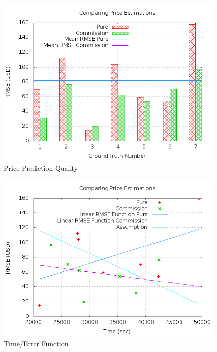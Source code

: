 \begin{figure}
\centering
\includegraphics[scale=0.55]{images/plots/crowdsourcing/plot_price_rmse.png}
\caption{Price Prediction Quality}
\label{crowdsourcing_desc_length}
\end{figure}
\begin{figure}
\centering
\includegraphics[scale=0.55]{images/plots/crowdsourcing/plot_time_rmse.png}
\caption{Time/Error Function}
\label{crowdsourcing_desc_length}
\end{figure}

